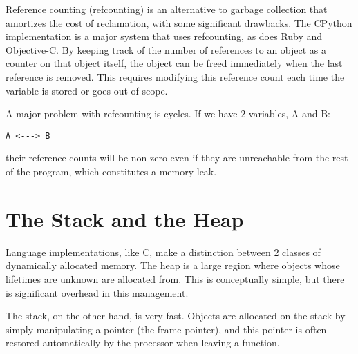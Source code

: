 \documentclass[twoside]{article}
\begin{document}
Reference counting (refcounting) is an alternative to garbage
collection that amortizes the cost of reclamation, with some
significant drawbacks.  The CPython implementation is a major system
that uses refcounting, as does Ruby and Objective-C.  By keeping track
of the number of references to an object as a counter on that object
itself, the object can be freed immediately when the last reference is
removed.  This requires modifying this reference count each time the
variable is stored or goes out of scope.

A major problem with refcounting is cycles.  If we have 2 variables, A
and B:
\begin{verbatim}
A <---> B
\end{verbatim}
their reference counts will be non-zero even if they are unreachable
from the rest of the program, which constitutes a memory leak.

\section{The Stack and the Heap}

Language implementations, like C, make a distinction between 2 classes
of dynamically allocated memory.  The heap is a large region where
objects whose lifetimes are unknown are allocated from.  This is
conceptually simple, but there is significant overhead in this
management.

The stack, on the other hand, is very fast.  Objects are allocated on
the stack by simply manipulating a pointer (the frame pointer), and
this pointer is often restored automatically by the processor when
leaving a function.
\end{document}
